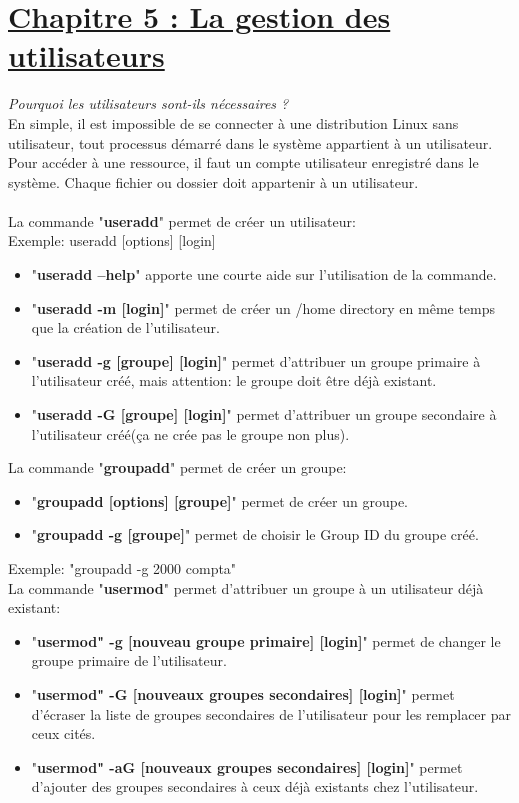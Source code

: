 \documentclass[12pt, a4paper]{article}
\begin{document}
\section*{\underline{Chapitre 5 : La gestion des utilisateurs}}
\emph{Pourquoi les utilisateurs sont-ils nécessaires ?}\\
En simple, il est impossible de se connecter à une distribution Linux sans utilisateur, tout processus démarré dans le système appartient à un utilisateur. Pour accéder à une ressource, il faut un compte utilisateur enregistré dans le système. Chaque fichier ou dossier doit appartenir à un utilisateur.\\
\\
La commande "\textbf{useradd}" permet de créer un utilisateur:\\
Exemple: useradd [options] [login]
\begin{itemize}
\setlength\itemsep{-0.5em}
\item "\textbf{useradd --help}" apporte une courte aide sur l'utilisation de la commande.
\item "\textbf{useradd -m [login]}" permet de créer un /home directory en même temps que la création de l'utilisateur.
\item "\textbf{useradd -g [groupe] [login]}" permet d'attribuer un groupe primaire à l'utilisateur créé, mais attention: le groupe doit être déjà existant.
\item "\textbf{useradd -G [groupe] [login]}" permet d'attribuer un groupe secondaire à l'utilisateur créé(ça ne crée pas le groupe non plus).
\end{itemize}
La commande "\textbf{groupadd}" permet de créer un groupe:
\begin{itemize}
\setlength\itemsep{-0.5em}
\item "\textbf{groupadd [options] [groupe]}" permet de créer un groupe.
\item "\textbf{groupadd -g [groupe]}" permet de choisir le Group ID du groupe créé.
\end{itemize}
Exemple: "groupadd -g 2000 compta"\\
\newpage\vspace*{1cm}
La commande "\textbf{usermod}" permet d'attribuer un groupe à un utilisateur déjà existant:
\begin{itemize}
\setlength\itemsep{-0.5em}
\item "\textbf{usermod" -g [nouveau groupe primaire] [login]}" permet de changer le groupe primaire de l'utilisateur.
\item "\textbf{usermod" -G [nouveaux groupes secondaires] [login]}" permet d'écraser la liste de groupes secondaires de l'utilisateur pour les remplacer par ceux cités.
\item "\textbf{usermod" -aG [nouveaux groupes secondaires] [login]}" permet d'ajouter des groupes secondaires à ceux déjà existants chez l'utilisateur.
\end{itemize}
\end{document}
